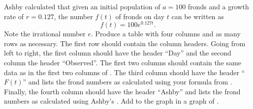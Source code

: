 \documentclass[a4paper,oneside,12pt]{article}
\begin{document}
\begin{problem}
\begin{packedenum}
  \item\label{subprob:exponential:duckweeds_growth_factor_exponential}
    Ashby calculated that given an initial population of $a = 100$
    fronds and a growth rate of $r = 0.127$, the number $f(t)$ of
    fronds on day $t$ can be written as
    \begin{equation}
    \label{eqn:exponential:frond_numbers_Ashby_formula}
    f(t)
    =
    100 e^{0.127t}.
    \end{equation}
    Note the irrational number $e$.  Produce a table with four columns
    and as many rows as necessary.  The first row should contain the
    column headers.  Going from left to right, the first column should
    have the header ``Day'' and the second column the header
    ``Observed''.  The first two columns should contain the same data
    as in the first two columns of
    .  The third
    column should have the header ``$F(t)$'' and lists the frond
    numbers as calculated using your formula
    from .
    Finally, the fourth column should have the header ``Ashby'' and
    lists the frond numbers as calculated using Ashby's
    .  Add to
    the graph
    in  a
    graph of .


\end{packedenum}
\end{problem}
\end{document}
